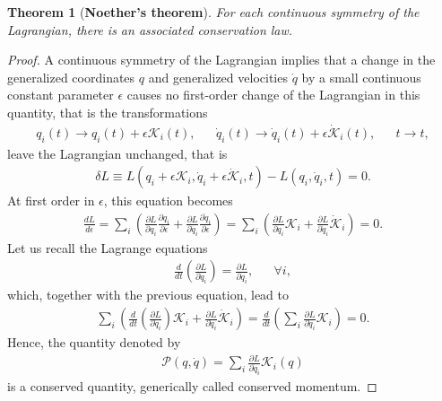 \documentclass[12pt,a4paper]{report}
\newtheorem{theorem}{Theorem}
\theoremstyle{definition}
\theoremstyle{remark}
\theoremstyle{remark}
\begin{document}
\begin{theorem}[\textbf{Noether's theorem}]
For each continuous symmetry of the Lagrangian, there is an associated conservation law.
\end{theorem}
\begin{proof}
A continuous symmetry of the Lagrangian implies that a change in the generalized coordinates $q$ and generalized velocities $\dot{q}$ by a small continuous constant parameter $\epsilon$ causes no first-order change of the Lagrangian in this quantity, that is the transformations
\begin{equation*}
\begin{aligned}
q_i(t)\rightarrow q_i(t)+\epsilon\mathcal{K}_i(t),&&\dot{q}_i(t)\rightarrow \dot{q}_i(t)+\epsilon\dot{\mathcal{K}}_i(t),&&t\rightarrow t,
\end{aligned}
\end{equation*}
leave the Lagrangian unchanged, that is
\begin{align*}
\delta L\equiv L(q_i+\epsilon\mathcal{K}_i,\dot{q}_i+\epsilon\dot{\mathcal{K}}_i,t)-L(q_i,\dot{q}_i,t)=0.
\end{align*}
At first order in $\epsilon$, this equation becomes
\begin{align*}
\frac{dL}{d\epsilon}=\sum_i\left(\frac{\partial L}{\partial q_i}\frac{\partial q_i}{\partial \epsilon}+\frac{\partial L}{\partial \dot{q}_i}\frac{\partial \dot{q}_i}{\partial \epsilon}\right)=\sum_i\left(\frac{\partial L}{\partial q_i}\mathcal{K}_i+\frac{\partial L}{\partial \dot{q}_i}\dot{\mathcal{K}}_i\right)=0.
\end{align*}
Let us recall the Lagrange equations
\begin{equation*}
\begin{aligned}
\frac{d}{dt}\left(\frac{\partial L}{\partial\dot{q}_i}\right)=\frac{\partial L}{\partial q_i},&&\forall i,
\end{aligned}
\end{equation*}
which, together with the previous equation, lead to
\begin{align*}
\sum_i\left(\frac{d}{dt}\left(\frac{\partial L}{\partial\dot{q}_i}\right)\mathcal{K}_i+\frac{\partial L}{\partial\dot{q}_i}\dot{\mathcal{K}}_i\right)=\frac{d}{dt}\left(\sum_i\frac{\partial L}{\partial\dot{q}_i}\mathcal{K}_i\right)=0.
\end{align*}
Hence, the quantity denoted by
\begin{align*}
\mathcal{P}(q,\dot{q})=\sum_i\frac{\partial L}{\partial\dot{q}_i}\mathcal{K}_i(q)
\end{align*}
is a conserved quantity, generically called conserved momentum.
\end{proof}
\end{document}
